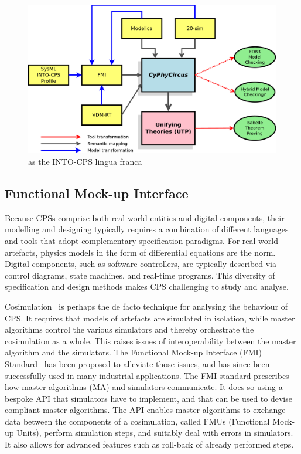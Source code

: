 \begin{figure}
  \begin{center}
    \includegraphics[width=14cm]{CyPhyCircus}
  \end{center}
  \caption{\CyPhyCircus as the INTO-CPS lingua franca}
  \label{fig:CyPhyCircus}
\end{figure}

\subsection{Functional Mock-up Interface}%

Because CPSs comprise both real-world entities and digital components, their modelling and designing typically requires a combination of different languages and tools that adopt complementary specification paradigms. For real-world artefacts, physics models in the form of differential equations are the norm. Digital components, such as software controllers, are typically described via control diagrams, state machines, and real-time programs. This diversity of specification and design methods makes CPS challenging to study and analyse.

Cosimulation~\cite{GomesTBLV2017} is perhaps the de facto technique for analysing the behaviour of CPS. It requires that models of artefacts are simulated in isolation, while master algorithms control the various simulators and thereby orchestrate the cosimulation as a whole. This raises issues of interoperability between the master algorithm and the simulators. The Functional Mock-up Interface (FMI) Standard~\cite{Blochwitz2011} has been proposed to alleviate those issues, and has since been successfully used in many industrial applications.  The FMI standard prescribes how master algorithms (MA) and simulators communicate. It does so using a bespoke API that simulators have to implement, and that can be used to devise compliant master algorithms. The API enables master algorithms to exchange data between the components of a cosimulation, called FMUs (Functional Mock-up Units), perform simulation steps, and suitably deal with errors in simulators. It also allows for advanced features such as roll-back of already performed steps.

